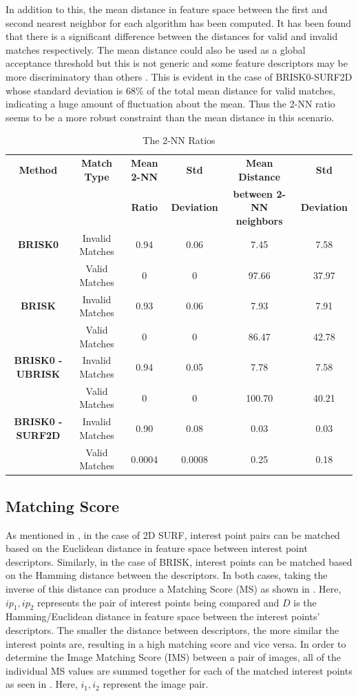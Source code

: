 In addition to this, the mean distance in feature space between the first and second nearest neighbor for each algorithm has been computed. It has been found that there is a significant difference between the distances for valid and invalid matches respectively. The mean distance could also be used as a global acceptance threshold but this is not generic and some feature descriptors may be more discriminatory than others \citep{Lowe2004}. This is evident in the case of BRISK0-SURF2D whose standard deviation is $68\%$ of the total mean distance for valid matches, indicating a huge amount of fluctuation about the mean. Thus the 2-NN ratio seems to be a more robust constraint than the mean distance in this scenario.\\

\begin{table}
\centering
\caption{The 2-NN Ratios}
\footnotesize
\begin{tabular}{|c|c|c|c|c|c|}
\hline 
\textbf{Method} & \textbf{Match Type} & \textbf{Mean 2-NN} & \textbf{Std } & \textbf{Mean Distance } & \textbf{Std }\tabularnewline
 &  & \textbf{ Ratio} & \textbf{Deviation} & \textbf{between 2-NN neighbors} & \textbf{Deviation}\tabularnewline
\hline 
\hline 
\textbf{BRISK0} & Invalid Matches & 0.94 & 0.06 & 7.45 & 7.58\tabularnewline
\hline 
 & Valid Matches & 0 & 0 & 97.66 & 37.97\tabularnewline
\hline 
\textbf{BRISK} & Invalid Matches & 0.93 & 0.06 & 7.93 & 7.91\tabularnewline
\hline 
 & Valid Matches & 0 & 0 & 86.47 & 42.78\tabularnewline
\hline 
\textbf{BRISK0 - UBRISK} & Invalid Matches & 0.94 & 0.05 & 7.78 & 7.58\tabularnewline
\hline 
 & Valid Matches & 0 & 0 & 100.70 & 40.21\tabularnewline
\hline 
\textbf{BRISK0 - SURF2D} & Invalid Matches & 0.90 & 0.08 & 0.03 & 0.03\tabularnewline
\hline 
 & Valid Matches & 0.0004 & 0.0008 & 0.25 & 0.18\tabularnewline
\hline 
\end{tabular}
\label{tab:knnCriterion}
\end{table}

\subsection{Matching Score}
\label{sec:matchingScore}
As mentioned in , in the case of 2D SURF, interest point pairs can be matched based on the Euclidean distance in feature space between interest point descriptors. Similarly, in the case of BRISK, interest points can be matched based on the Hamming distance between the descriptors. In both cases, taking the inverse of this distance can produce a Matching Score (MS) as shown in  \citep{AndersonTechnical, Briggs}. Here, $ip_1, ip_2$ represents the pair of interest points being compared and $D$ is the Hamming/Euclidean distance in feature space between the interest points' descriptors. The smaller the distance between descriptors, the more similar the interest points are, resulting in a high matching score and vice versa. In order to determine the Image Matching Score (IMS) between a pair of images, all of the individual MS values are summed together for each of the matched interest points as seen in . Here, $i_1, i_2$ represent the image pair. \\

